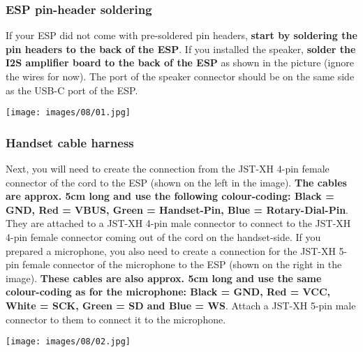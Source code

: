 \documentclass[]{article}
\begin{document}
\subsubsection{ESP pin-header soldering}
\begin{minipage}[t]{0.4\linewidth}
	\vspace{0pt}
	If your ESP did not come with pre-soldered pin headers, \textbf{start by soldering the pin headers to the back of the ESP}.
	\newline
	\newline
	If you installed the speaker, \textbf{solder the I2S amplifier board to the back of the ESP} as shown in the picture (ignore the wires for now). The port of the speaker connector should be on the same side as the USB-C port of the ESP.
\end{minipage}
\hfill
\begin{minipage}[t]{0.5\linewidth}
	\vspace{0pt}
	\texttt{[image: images/08/01.jpg]}
\end{minipage}
\subsubsection{Handset cable harness}
\begin{minipage}[t]{0.4\linewidth}
	\vspace{0pt}
	Next, you will need to create the connection from the JST-XH 4-pin female connector of the cord to the ESP (shown on the left in the image). \textbf{The cables are approx. 5cm long and use the following colour-coding: Black = GND, Red = VBUS, Green = Handset-Pin, Blue = Rotary-Dial-Pin}. They are attached to a JST-XH 4-pin male connector to connect to the JST-XH 4-pin female connector coming out of the cord on the handset-side.
	\newline
	\newline
	If you prepared a microphone, you also need to create a connection for the JST-XH 5-pin female connector of the microphone to the ESP (shown on the right in the image). \textbf{These cables are also approx. 5cm long and use the same colour-coding as for the microphone: Black = GND, Red = VCC, White = SCK, Green = SD and Blue = WS}. Attach a JST-XH 5-pin male connector to them to connect it to the microphone.
\end{minipage}
\hfill
\begin{minipage}[t]{0.5\linewidth}
	\vspace{0pt}
	\texttt{[image: images/08/02.jpg]}
\end{minipage}
\end{document}
